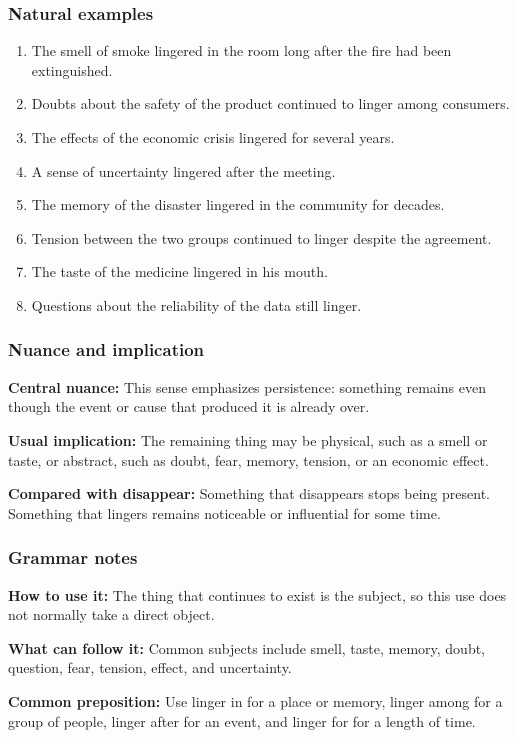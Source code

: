 \documentclass[11pt]{article}
\begin{document}
\subsubsection{Natural examples}
\begin{enumerate}
  \item The smell of smoke lingered in the room long after the fire had been extinguished.
  \item Doubts about the safety of the product continued to linger among consumers.
  \item The effects of the economic crisis lingered for several years.
  \item A sense of uncertainty lingered after the meeting.
  \item The memory of the disaster lingered in the community for decades.
  \item Tension between the two groups continued to linger despite the agreement.
  \item The taste of the medicine lingered in his mouth.
  \item Questions about the reliability of the data still linger.
\end{enumerate}

\subsubsection{Nuance and implication}
\textbf{Central nuance:} This sense emphasizes persistence: something remains even though the event or cause that produced it is already over.

\textbf{Usual implication:} The remaining thing may be physical, such as a smell or taste, or abstract, such as doubt, fear, memory, tension, or an economic effect.

\textbf{Compared with disappear:} Something that disappears stops being present. Something that lingers remains noticeable or influential for some time.

\subsubsection{Grammar notes}
\textbf{How to use it:} The thing that continues to exist is the subject, so this use does not normally take a direct object.

\textbf{What can follow it:} Common subjects include smell, taste, memory, doubt, question, fear, tension, effect, and uncertainty.

\textbf{Common preposition:} Use linger in for a place or memory, linger among for a group of people, linger after for an event, and linger for for a length of time.
\end{document}
